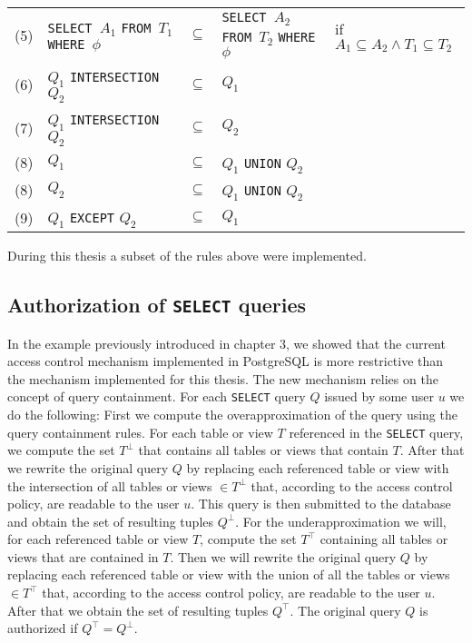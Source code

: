 {\begin{center}
\begin{tabular}{ p{5mm} p{40mm} p{5mm} p{25mm} p{25mm} }
	(5) \label{proj2} &
	\texttt{SELECT $A_1$} \newline
	\texttt{FROM $T_1$} \newline
	\texttt{WHERE $\phi$} &
	$\subseteq$ &
	\texttt{SELECT $A_2$} \newline
	\texttt{FROM $T_2$} \newline
	\texttt{WHERE $\phi$}&
	if $A_1 \subseteq A_2 \land T_1 \subseteq T_2$
	\\
	
	(6) \label{intersect1} &
	$Q_1$ \texttt{INTERSECTION} $Q_2$ &
	$\subseteq$ &
	$Q_1$&
	\\
	
	(7) \label{intersect2} &
	$Q_1$ \texttt{INTERSECTION} $Q_2$ &
	$\subseteq$ &
	$Q_2$&
	\\
	
	(8) \label{union1} &
	$Q_1$&
	$\subseteq$ &
	$Q_1$ \texttt{UNION} $Q_2$ &
	\\
	
	(8) \label{union2} &
	$Q_2$&
	$\subseteq$ &
	$Q_1$ \texttt{UNION} $Q_2$ &
	\\
	
	(9) \label{except} &
	$Q_1$ \texttt{EXCEPT} $Q_2$ &
	$\subseteq$ &
	$Q_1$&
	\\
	\end{tabular}
\end{center}

During this thesis a subset of the rules above were implemented.

\subsection{Authorization of \texttt{SELECT} queries}

In the example previously introduced in chapter 3, we showed that the current access control mechanism implemented in PostgreSQL is more restrictive than the mechanism implemented for this thesis.
%
The new mechanism relies on the concept of query containment.
%
For each \texttt{SELECT} query $Q$ issued by some user $u$ we do the following:
%
First we compute the overapproximation of the query using the query containment rules.
%
For each table or view $T$ referenced in the \texttt{SELECT} query, we compute the set $T^\bot$ that contains all tables or views that contain $T$.
%
After that we rewrite the original query $Q$ by replacing each referenced table or view with the intersection of all tables or views $\in T^\bot$ that, according to the access control policy, are readable to the user $u$.
%
This query is then submitted to the database and obtain the set of resulting tuples $Q^\bot$.
%
For the underapproximation we will, for each referenced table or view $T$, compute the set $T^\top$ containing all tables or views that are contained in $T$.
%
Then we will rewrite the original query $Q$ by replacing each referenced table or view with the union of all the tables or views $\in T^\top$ that, according to the access control policy, are readable to the user $u$.
%
After that we obtain the set of resulting tuples $Q^\top$.
%
The original query $Q$ is authorized if $Q^\top = Q^\bot$.

}
